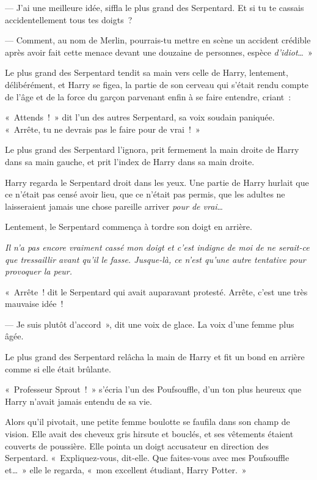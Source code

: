 --- J'ai une meilleure idée, siffla le plus grand des Serpentard. Et si tu te cassais accidentellement tous tes doigts~?

--- Comment, au nom de Merlin, pourrais-tu mettre en scène un accident crédible après avoir fait cette menace devant une douzaine de personnes, espèce \emph{d'idiot}…~»

Le plus grand des Serpentard tendit sa main vers celle de Harry, lentement, délibérément, et Harry se figea, la partie de son cerveau qui s'était rendu compte de l'âge et de la force du garçon parvenant enfin à se faire entendre, criant~: 

«~Attends~!~» dit l'un des autres Serpentard, sa voix soudain paniquée. «~Arrête, tu ne devrais pas le faire pour de vrai~!~»

Le plus grand des Serpentard l'ignora, prit fermement la main droite de Harry dans sa main gauche, et prit l'index de Harry dans sa main droite.

Harry regarda le Serpentard droit dans les yeux. Une partie de Harry hurlait que ce n'était pas censé avoir lieu, que ce n'était pas permis, que les adultes ne laisseraient jamais une chose pareille arriver \emph{pour de vrai}…

Lentement, le Serpentard commença à tordre son doigt en arrière.

\emph{Il n'a pas encore vraiment cassé mon doigt et c'est indigne de moi de ne serait-ce que tressaillir avant qu'il le fasse. Jusque-là, ce n'est qu'une autre tentative pour provoquer la peur.}

«~Arrête~! dit le Serpentard qui avait auparavant protesté. Arrête, c'est une très mauvaise idée~!

--- Je suis plutôt d'accord~», dit une voix de glace. La voix d'une femme plus âgée.

Le plus grand des Serpentard relâcha la main de Harry et fit un bond en arrière comme si elle était brûlante.

«~Professeur Sprout~!~» s'écria l'un des Poufsouffle, d'un ton plus heureux que Harry n'avait jamais entendu de sa vie.

Alors qu'il pivotait, une petite femme boulotte se faufila dans son champ de vision. Elle avait des cheveux gris hirsute et bouclés, et ses vêtements étaient couverts de poussière. Elle pointa un doigt accusateur en direction des Serpentard. «~Expliquez-vous, dit-elle. Que faites-vous avec mes Poufsouffle et…~» elle le regarda, «~mon excellent étudiant, Harry Potter.~»

